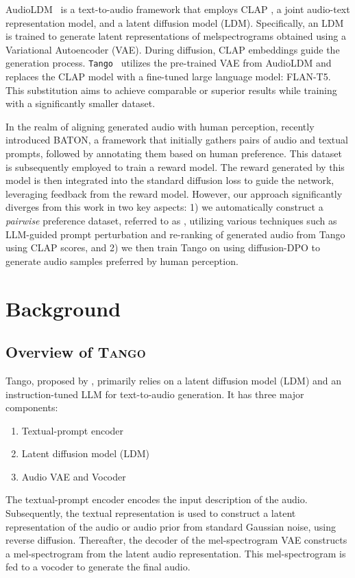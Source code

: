 AudioLDM~\cite{liu2023audioldm} is a text-to-audio framework that employs CLAP \cite{wu2023large}, a joint audio-text representation model, and a latent diffusion model (LDM). Specifically, an LDM is trained to generate latent representations of melspectrograms obtained using a Variational Autoencoder (VAE). During diffusion, CLAP embeddings guide the generation process. \texttt{Tango}~\cite{ghosal2023tango} utilizes the pre-trained VAE from AudioLDM and replaces the CLAP model with a fine-tuned large language model: FLAN-T5. This substitution aims to achieve comparable or superior results while training with a significantly smaller dataset.

In the realm of aligning generated audio with human perception, \citet{liao2024baton} recently introduced BATON, a framework that initially gathers pairs of audio and textual prompts, followed by annotating them based on human preference. This dataset is subsequently employed to train a reward model. The reward generated by this model is then integrated into the standard diffusion loss to guide the network, leveraging feedback from the reward model. However, our approach significantly diverges from this work in two key aspects: 1) we automatically construct a \emph{pairwise} preference dataset, referred to as \dataset{}, utilizing various techniques such as LLM-guided prompt perturbation and re-ranking of generated audio from Tango using CLAP scores, and 2) we then train Tango on \dataset{} using diffusion-DPO to generate audio samples preferred by human perception.

\section{Background}

\subsection{Overview of \textsc{Tango}}

Tango, proposed by \citet{ghosal2023text}, primarily relies on a latent diffusion model (LDM) and an instruction-tuned LLM for text-to-audio generation. It has three major components: \begin{enumerate}
    \item Textual-prompt encoder
    \item Latent diffusion model (LDM)
    \item Audio VAE and Vocoder
  \end{enumerate}  
The textual-prompt encoder encodes the input description of the audio. Subsequently, the textual representation is used to construct a latent representation of the audio or audio prior from standard Gaussian noise, using reverse diffusion. Thereafter, the decoder of the mel-spectrogram VAE constructs a mel-spectrogram from the latent audio representation. This mel-spectrogram is fed to a vocoder to generate the final audio. 

